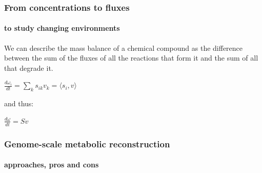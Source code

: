 \documentclass{beamer}
\begin{document}
   \begin{frame}
      \frametitle{From concentrations to fluxes}
      \framesubtitle{to study changing environments}

      We can describe the mass balance of a chemical compound as the difference between the sum of the 
      fluxes of all the reactions that form it and the sum of all that degrade it. 

      \bigskip 

      $\frac {d\omega_i}{dt} = \sum \limits_{k} s_{ik} v_k =  \langle  s_{i} , v \rangle  $

      \bigskip

      and thus:

      \bigskip 

      $\frac {d\omega}{dt} = Sv$

   \end{frame}



   \begin{frame}
      \frametitle{Genome-scale metabolic reconstruction}
      \framesubtitle{approaches, pros and cons}      
      \begin{singlespace}
      \end{singlespace}
   \end{frame}
   
\end{document}
